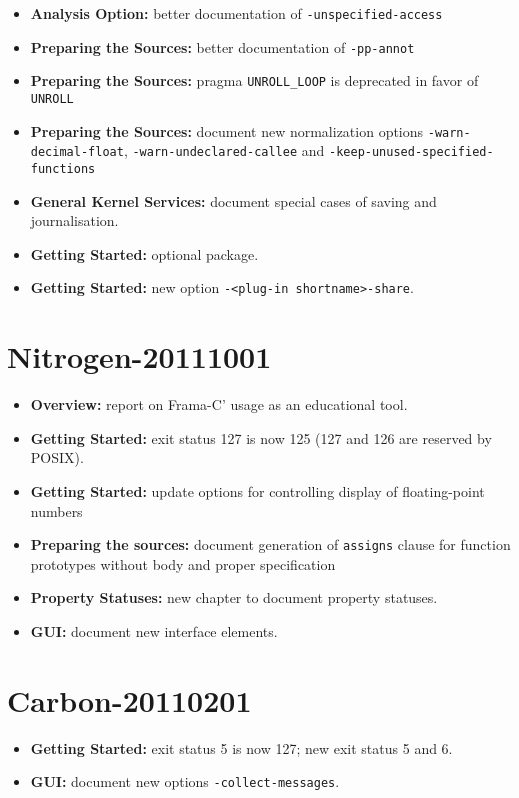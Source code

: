 \begin{itemize}
\item \textbf{Analysis Option:} better documentation of
\texttt{-unspecified-access}
\item \textbf{Preparing the Sources:} better documentation of \texttt{-pp-annot}
\item \textbf{Preparing the Sources:} pragma \texttt{UNROLL\_LOOP} is
deprecated in favor of \texttt{UNROLL}
\item \textbf{Preparing the Sources:} document new normalization options
  \texttt{-warn-decimal-float}, \texttt{-warn-undeclared-callee} and
  \texttt{-keep-unused-specified-functions}
\item \textbf{General Kernel Services:} document special cases of saving and
  journalisation.
\item \textbf{Getting Started:} optional  package.
\item \textbf{Getting Started:} new option \texttt{-<plug-in shortname>-share}.
\end{itemize}

\section*{Nitrogen-20111001}

\begin{itemize}
\item \textbf{Overview:} report on Frama-C' usage as an educational tool.
\item \textbf{Getting Started:} exit status 127 is now 125 (127 and 126 are
reserved by POSIX).
\item \textbf{Getting Started:} update options for controlling display of
  floating-point numbers
\item \textbf{Preparing the sources:} document generation of \texttt{assigns}
  clause for function prototypes without body and proper specification
\item \textbf{Property Statuses:} new chapter to document property statuses.
\item \textbf{GUI:} document new interface elements.
\end{itemize}

\section*{Carbon-20110201}

\begin{itemize}
\item \textbf{Getting Started:} exit status 5 is now 127;
new exit status 5 and 6.
\item \textbf{GUI:} document new options \texttt{-collect-messages}.
\end{itemize}


